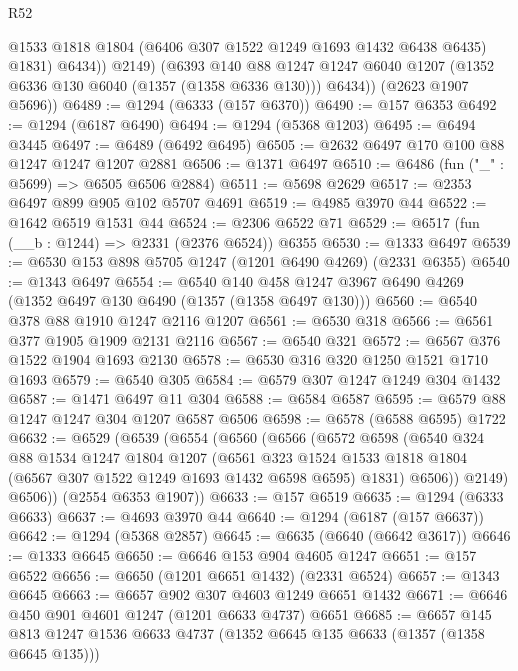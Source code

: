 \begin{lexlean}{R52}
\begin{coremodule}
                @1533
                @1818
                @1804
                (@6406 @307 @1522 @1249 @1693 @1432 @6438 @6435)
                @1831)
              @6434))
          @2149)
        (@6393
          @140
          @88
          @1247
          @1247
          @6040
          @1207
          (@1352 @6336 @130 @6040 (@1357 (@1358 @6336 @130)))
          @6434))
      (@2623 @1907 @5696))
@6489 := @1294 (@6333 (@157 @6370))
@6490 := @157 @6353
@6492 := @1294 (@6187 @6490)
@6494 := @1294 (@5368 @1203)
@6495 := @6494 @3445
@6497 := @6489 (@6492 @6495)
@6505 := @2632 @6497 @170 @100 @88 @1247 @1247 @1207 @2881
@6506 := @1371 @6497
@6510 := @6486 (fun ("_" : @5699) => @6505 @6506 @2884)
@6511 := @5698 @2629
@6517 := @2353 @6497 @899 @905 @102 @5707 @4691
@6519 := @4985 @3970 @44
@6522 := @1642 @6519 @1531 @44
@6524 := @2306 @6522 @71
@6529 := @6517 (fun (__b : @1244) => @2331 (@2376 @6524)) @6355
@6530 := @1333 @6497
@6539 := @6530 @153 @898 @5705 @1247 (@1201 @6490 @4269) (@2331 @6355)
@6540 := @1343 @6497
@6554 := @6540 @140 @458 @1247 @3967 @6490 @4269 (@1352 @6497 @130 @6490 (@1357 (@1358 @6497 @130)))
@6560 := @6540 @378 @88 @1910 @1247 @2116 @1207
@6561 := @6530 @318
@6566 := @6561 @377 @1905 @1909 @2131 @2116
@6567 := @6540 @321
@6572 := @6567 @376 @1522 @1904 @1693 @2130
@6578 := @6530 @316 @320 @1250 @1521 @1710 @1693
@6579 := @6540 @305
@6584 := @6579 @307 @1247 @1249 @304 @1432
@6587 := @1471 @6497 @11 @304
@6588 := @6584 @6587
@6595 := @6579 @88 @1247 @1247 @304 @1207 @6587 @6506
@6598 := @6578 (@6588 @6595) @1722
@6632 := @6529
    (@6539
      (@6554
        (@6560
          (@6566
            (@6572
              @6598
              (@6540
                @324
                @88
                @1534
                @1247
                @1804
                @1207
                (@6561
                  @323
                  @1524
                  @1533
                  @1818
                  @1804
                  (@6567 @307 @1522 @1249 @1693 @1432 @6598 @6595)
                  @1831)
                @6506))
            @2149)
          @6506))
      (@2554 @6353 @1907))
@6633 := @157 @6519
@6635 := @1294 (@6333 @6633)
@6637 := @4693 @3970 @44
@6640 := @1294 (@6187 (@157 @6637))
@6642 := @1294 (@5368 @2857)
@6645 := @6635 (@6640 (@6642 @3617))
@6646 := @1333 @6645
@6650 := @6646 @153 @904 @4605 @1247
@6651 := @157 @6522
@6656 := @6650 (@1201 @6651 @1432) (@2331 @6524)
@6657 := @1343 @6645
@6663 := @6657 @902 @307 @4603 @1249 @6651 @1432
@6671 := @6646 @450 @901 @4601 @1247 (@1201 @6633 @4737) @6651
@6685 := @6657 @145 @813 @1247 @1536 @6633 @4737 (@1352 @6645 @135 @6633 (@1357 (@1358 @6645 @135)))

\end{coremodule}
\end{lexlean}
